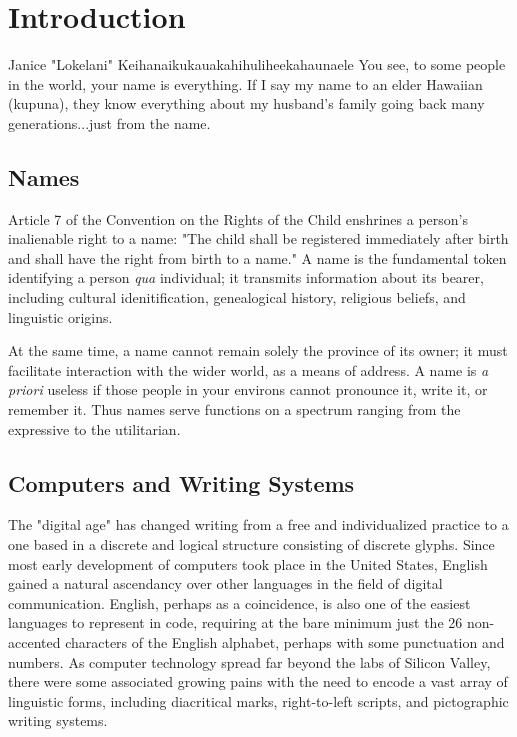 \section{Introduction}

\begin{aquote}{Janice "Lokelani" Keihanaikukauakahihuliheekahaunaele}
You see, to some people in the world, your name is everything. If I say my name
to an elder Hawaiian (kupuna), they know everything about my husband's family
going back many generations...just from the name.
\end{aquote}

\subsection{Names}

Article 7 of the Convention on the Rights of the Child enshrines a person's
inalienable right to a name: "The child shall be registered immediately after
birth and shall have the right from birth to a name." \parencite{crc} A name is
the fundamental token identifying a person \textit{qua} individual; it transmits
information about its bearer, including cultural idenitification, genealogical
history, religious beliefs, and linguistic origins.

At the same time, a name cannot remain solely the province of its owner; it must
facilitate interaction with the wider world, as a means of address. A name is
\textit{a priori} useless if those people in your environs cannot pronounce it,
write it, or remember it. Thus names serve functions on a spectrum ranging from
the expressive to the utilitarian.

\subsection{Computers and Writing Systems}

The "digital age" has changed writing from a free and individualized practice to
a one based in a discrete and logical structure consisting of discrete glyphs.
Since most early development of computers took place in the United States,
English gained a natural ascendancy over other languages in the field of digital
communication. English, perhaps as a coincidence, is also one of the easiest
languages to represent in code, requiring at the bare minimum just the 26
non-accented characters of the English alphabet, perhaps with some punctuation
and numbers. As computer technology spread far beyond the labs of Silicon
Valley, there were some associated growing pains with the need to encode a vast
array of linguistic forms, including diacritical marks, right-to-left scripts,
and pictographic writing systems.
